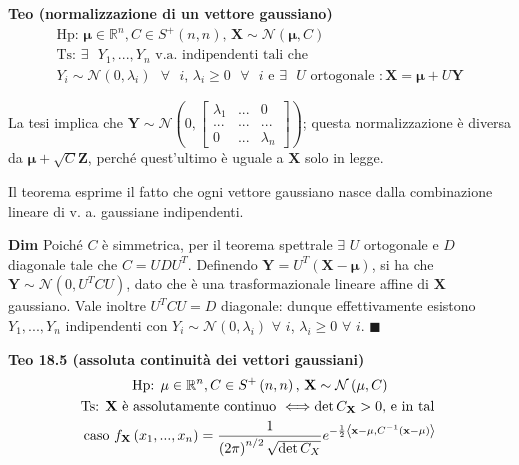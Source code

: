 \documentclass{article}
\begin{document}
\textbf{Teo (normalizzazione di un vettore gaussiano)}%
\begin{gather*}
\text{Hp: }\mathbf{\mu }\in 
\mathbb{R}
^{n},C\in S^{+}\left( n,n\right) \text{, }\mathbf{X}\sim \mathcal{N}\left( 
\mathbf{\mu },C\right) \\
\text{Ts: }\exists \text{ }Y_{1},...,Y_{n}\text{ v.a. indipendenti tali che}
\\
Y_{i}\sim \mathcal{N}\left( 0,\lambda _{i}\right) \text{ }\forall \text{ }i%
\text{, }\lambda _{i}\geq 0\text{ }\forall \text{ }i\text{ e }\exists \text{ 
}U\text{ ortogonale }:\mathbf{X}=\mathbf{\mu }+U\mathbf{Y}
\end{gather*}

La tesi implica che $\mathbf{Y}\sim \mathcal{N}\left( 0,\left[ 
\begin{array}{ccc}
\lambda _{1} & ... & 0 \\ 
... & ... & ... \\ 
0 & ... & \lambda _{n}%
\end{array}%
\right] \right) $; questa normalizzazione \`{e} diversa da $\mathbf{\mu }+%
\sqrt{C}\mathbf{Z}$, perch\'{e} quest'ultimo \`{e} uguale a $\mathbf{X}$
solo in legge.

Il teorema esprime il fatto che ogni vettore gaussiano nasce dalla
combinazione lineare di v. a. gaussiane indipendenti.

\textbf{Dim} Poich\'{e} $C$ \`{e} simmetrica, per il teorema spettrale $%
\exists $ $U$ ortogonale e $D$ diagonale tale che $C=UDU^{T}$. Definendo $%
\mathbf{Y}=U^{T}\left( \mathbf{X-\mu }\right) $, si ha che $\mathbf{Y}\sim 
\mathcal{N}\left( 0,U^{T}CU\right) $, dato che \`{e} una trasformazionale
lineare affine di $\mathbf{X}$ gaussiano. Vale inoltre $U^{T}CU=D$
diagonale: dunque effettivamente esistono $Y_{1},...,Y_{n}$ indipendenti con 
$Y_{i}\sim \mathcal{N}\left( 0,\lambda _{i}\right) $ $\forall $ $i$, $%
\lambda _{i}\geq 0$ $\forall $ $i$. $\blacksquare $

\textbf{Teo 18.5 (assoluta continuit\`{a} dei vettori gaussiani)}%
\begin{gather*}
\text{Hp}\text{: }\mathbf{\mu }\in 
\mathbb{R}
^{n},C\in S^{+}\left( n,n\right) \text{, }\mathbf{X}\sim \mathcal{N}\left( 
\mathbf{\mu },C\right) \\
\text{Ts}\text{: }\mathbf{X}\text{ \`{e} assolutamente continuo }%
\Longleftrightarrow \det C_{\mathbf{X}}>0\text{, e in tal } \\
\text{caso }f_{\mathbf{X}}\left( x_{1},...,x_{n}\right) =\frac{1}{\left(
2\pi \right) ^{n/2}\sqrt{\det C_{X}}}e^{-\frac{1}{2}\left\langle \mathbf{%
x-\mu },C^{-1}\left( \mathbf{x-\mu }\right) \right\rangle }
\end{gather*}
\end{document}
